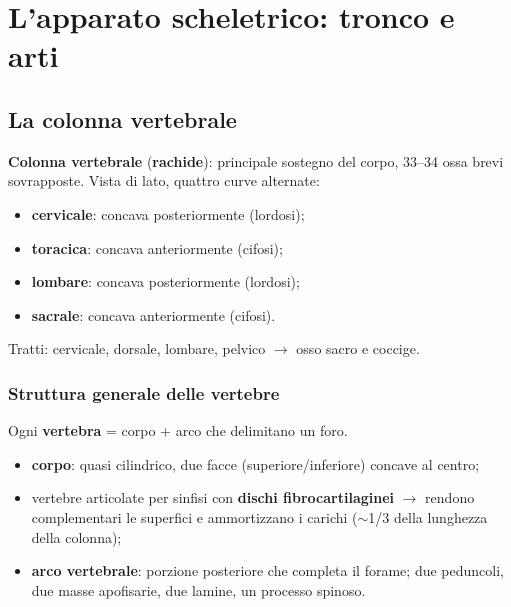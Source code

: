 \chapter{L'apparato scheletrico: tronco e arti}

\section{La colonna vertebrale}

\textbf{Colonna vertebrale} (\textbf{rachide}): principale sostegno del corpo, 33--34 ossa brevi
sovrapposte. Vista di lato, quattro curve alternate:
\begin{itemize}
  \item \textbf{cervicale}: concava posteriormente (lordosi);
  \item \textbf{toracica}: concava anteriormente (cifosi);
  \item \textbf{lombare}: concava posteriormente (lordosi);
  \item \textbf{sacrale}: concava anteriormente (cifosi).
\end{itemize}
Tratti: cervicale, dorsale, lombare, pelvico $\rightarrow$ osso sacro e coccige.

\subsection{Struttura generale delle vertebre}
Ogni \textbf{vertebra} = corpo + arco che delimitano un foro.
\begin{itemize}
  \item \textbf{corpo}: quasi cilindrico, due facce (superiore/inferiore) concave al centro;
  \item vertebre articolate per sinfisi con \textbf{dischi fibrocartilaginei} $\rightarrow$ rendono
    complementari le superfici e ammortizzano i carichi ($\sim$1/3 della lunghezza della colonna);
  \item \textbf{arco vertebrale}: porzione posteriore che completa il forame; due peduncoli, due
    masse apofisarie, due lamine, un processo spinoso.
\end{itemize}

